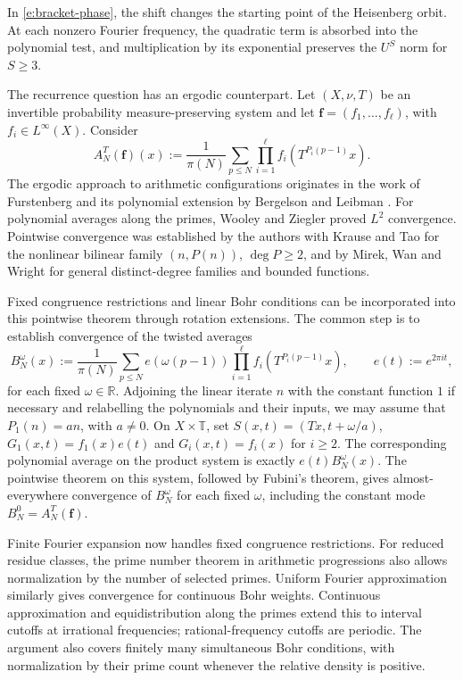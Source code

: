 \documentclass[12pt]{amsart}
\newcommand{\1}{\mathbf 1}
\theoremstyle{definition}
\begin{document}
In \eqref{e:bracket-phase}, the shift changes the starting point of
the Heisenberg orbit. At each nonzero Fourier frequency, the
quadratic term is absorbed into the polynomial test, and
multiplication by its exponential preserves the $U^S$ norm for
$S\geq3$.

\bigskip

The recurrence question has an ergodic counterpart. Let $(X,\nu,T)$
be an invertible probability measure-preserving system and let
$\mathbf f=(f_1,\ldots,f_\ell)$, with $f_i\in L^\infty(X)$. Consider
\begin{equation}\label{e:prime-ergodic-average}
 A_N^T(\mathbf f)(x)
 :=\frac1{\pi(N)}\sum_{p\leq N}
       \prod_{i=1}^{\ell}f_i(T^{P_i(p-1)}x).
\end{equation}
The ergodic approach to arithmetic configurations originates in
the work of Furstenberg \cite{Furstenberg} and its polynomial
extension by Bergelson and Leibman \cite{BergelsonLeibman}.
For polynomial averages along the primes, Wooley and Ziegler
\cite{WooleyZiegler} proved $L^2$ convergence. Pointwise convergence
was established by the authors with Krause and  Tao
\cite{KMTTPrimes} for the nonlinear bilinear family $(n,P(n))$,
$\deg P\geq2$, and by Mirek, Wan and Wright
\cite[Theorem~1.1(ii)]{MirekWanWright} for general distinct-degree
families and bounded functions. 

Fixed congruence restrictions and linear Bohr conditions can be
incorporated into this pointwise theorem through rotation extensions.
The common step is to establish convergence of the twisted averages
\[
 B_N^\omega(x)
 :=\frac1{\pi(N)}\sum_{p\leq N}e(\omega(p-1))
       \prod_{i=1}^{\ell}f_i(T^{P_i(p-1)}x),
 \qquad e(t):=e^{2\pi it},
\]
for each fixed $\omega\in\mathbb R$. Adjoining the linear iterate $n$
with the constant function $1$ if necessary and relabelling the
polynomials and their inputs, we may assume that $P_1(n)=an$,
with $a\ne0$. On $X\times\mathbb T$, set
$S(x,t)=(Tx,t+\omega/a)$, $G_1(x,t)=f_1(x)e(t)$ and
$G_i(x,t)=f_i(x)$ for $i\geq2$. The corresponding polynomial average
on the product system is exactly $e(t)B_N^\omega(x)$.
The pointwise theorem on this system, followed by Fubini's theorem,
gives almost-everywhere convergence of $B_N^\omega$ for each
fixed $\omega$, including the constant mode
$B_N^0=A_N^T(\mathbf f)$.

Finite Fourier expansion now handles fixed congruence restrictions.
For reduced residue classes, the prime number theorem in arithmetic
progressions also allows normalization by the number of selected
primes. Uniform Fourier approximation similarly gives convergence
for continuous Bohr weights. Continuous approximation and
equidistribution along the primes extend this to interval cutoffs
at irrational frequencies; rational-frequency cutoffs are periodic.
The argument also covers finitely many simultaneous Bohr conditions,
with normalization by their prime count whenever the relative
density is positive.
\end{document}
